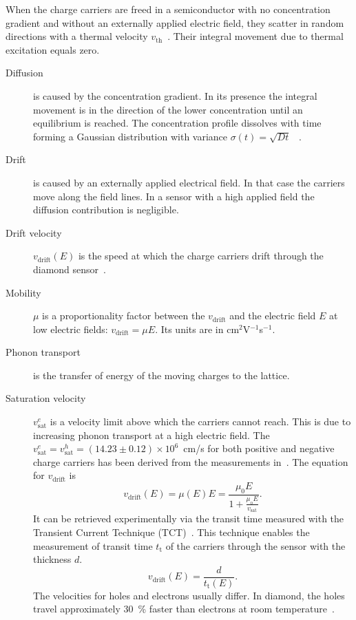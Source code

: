 When the charge carriers are freed in a semiconductor with no concentration gradient and without an externally applied electric field, they scatter in random directions with a thermal velocity $v_{\mathrm{th}}$~\cite{PHSEM:00000}. Their integral movement due to thermal excitation equals zero. 

\begin{description}

\item[Diffusion] is caused by the concentration gradient. In its presence the integral movement is in the direction of the lower concentration until an equilibrium is reached.
The concentration profile dissolves with time forming a Gaussian distribution with variance $\sigma(t)=\sqrt{Dt}$~\cite{PHSEM:00000} .

\item[Drift] is caused by an externally applied electrical field. In that case the carriers move along the field lines. In a sensor with a high applied field the diffusion contribution is negligible. 

\item[Drift velocity] $v_\mathrm{drift}(E)$ is the speed at which the charge carriers drift through the diamond sensor~\cite{PHSEM:00000}.

\item[Mobility] $\mu$ is a proportionality factor between the $v_\mathrm{drift}$ and the electric field $E$ at low electric fields: $v_\mathrm{drift} = \mu E$. Its units are in cm$^2$V$^{-1}$s$^{-1}$.

\item[Phonon transport] is the transfer of energy of the moving charges to the lattice.

\item[Saturation velocity] $v^e_\mathrm{sat}$ is a velocity limit above which the carriers cannot reach. This is due to increasing phonon transport at a high electric field. The $v^e_\mathrm{sat}=v^h_\mathrm{sat}=(14.23\pm0.12)\times10^6$~cm/s for both positive and negative charge carriers has been derived from the measurements in~\cite{JANSEN:00001}. The equation for $v_\mathrm{drift}$ is~\cite{VDRIFT:00000}
\begin{equation}
\label{eq:vsat}
v_\mathrm{drift}(E) = \mu(E)E= \frac{\mu_\mathrm{0} E}{1 + \frac{\mu_\mathrm{o} E}{v_\mathrm{sat}}}.
\end{equation}
It can be retrieved experimentally via the transit time measured with the Transient Current Technique (TCT)~\cite{PERNEG:00001}. This technique enables the measurement of transit time $t_\mathrm{t}$ of the carriers through the sensor with the thickness $d$. 
\begin{equation}
\label{eq:vsat}
v_\mathrm{drift}(E) = \frac{d}{t_\mathrm{t}(E)}.
\end{equation}
The velocities for holes and electrons usually differ. In diamond, the holes travel approximately 30~\% faster than electrons at room temperature~\cite{Jansen:1956431}.


\end{description}

